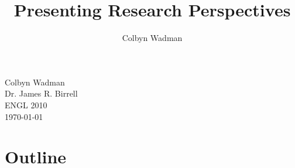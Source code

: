 \documentclass[12pt]{article}
\title{Presenting Research Perspectives}
\author{Colbyn Wadman}
\begin{document}
\begin{flushleft}

Colbyn Wadman\\
Dr. James R. Birrell\\
ENGL 2010\\
\today\\
\section*{\centering Outline}
\setcounter{section}{1}

\setlength{\parindent}{0.5in} 








\end{flushleft}
\end{document}
